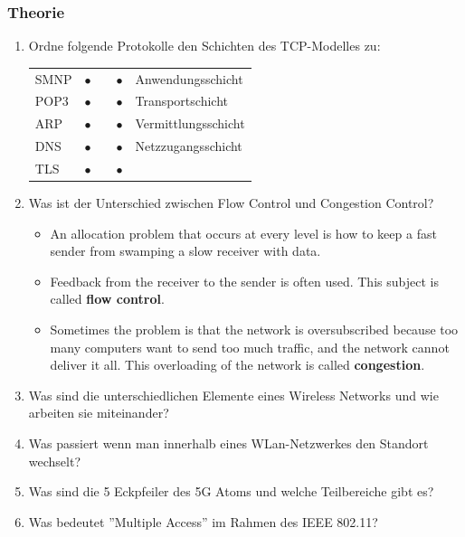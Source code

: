 \documentclass{scrartcl}
\begin{document}
\subsubsection{Theorie}
    \begin{enumerate}
        \item Ordne folgende Protokolle den Schichten des TCP-Modelles zu:
        \begin{center}
            \begin{tabular}{l|lll|l}
                SMNP        & $\bullet$ & & $\bullet$ &  Anwendungsschicht   \\
                POP3        & $\bullet$ & & $\bullet$ &  Transportschicht    \\
                ARP         & $\bullet$ & & $\bullet$ &  Vermittlungsschicht \\
                DNS         & $\bullet$ & & $\bullet$ &  Netzzugangsschicht  \\
                TLS         & $\bullet$ & & $\bullet$ &                      \\
            \end{tabular}
        \end{center}
        \item Was ist der Unterschied zwischen Flow Control und Congestion Control?
        \begin{itemize}
            \item An allocation problem that occurs at every level is how to keep a fast sender from swamping a slow receiver with data.
            \item Feedback from the receiver to the sender is often used. This subject is called \textbf{flow control}.
            \item Sometimes the problem is that the network is oversubscribed because too many computers want to send too much traffic,
            and the network cannot deliver it all. This overloading of the network is called \textbf{congestion}.
        \end{itemize}
        \item Was sind die unterschiedlichen Elemente eines Wireless Networks und wie arbeiten sie miteinander?
        \item Was passiert wenn man innerhalb eines WLan-Netzwerkes den Standort wechselt? 
        \item Was sind die 5 Eckpfeiler des 5G Atoms und welche Teilbereiche gibt es?
        \item Was bedeutet ''Multiple Access'' im Rahmen des IEEE 802.11?

\end{enumerate}
\end{document}

